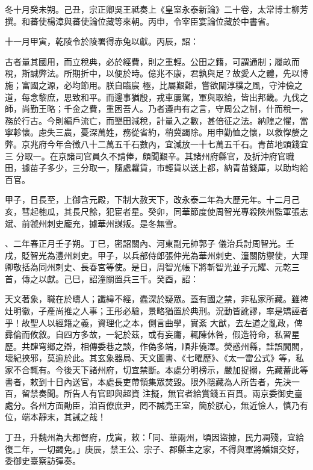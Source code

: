 \begin{pinyinscope}
 冬十月癸未朔。己丑，宗正卿吳王祗奏上《皇室永泰新論》二十卷，太常博士柳芳撰。和蕃使楊漳與蕃使論位藏等來朝。丙申，令宰臣宴論位藏於中書省。



 十一月甲寅，乾陵令於陵署得赤兔以獻。丙辰，詔：



 古者量其國用，而立稅典，必於經費，則之重輕。公田之籍，可謂通制；履畝而稅，斯誠弊法。所期折中，以便於時。億兆不康，君孰與足？故愛人之體，先以博施；富國之源，必均節用。朕自臨宸
 極，比屬艱難，嘗欲闡淳樸之風，守沖儉之道，每念黎庶，思致和平。而邊事猶殷，戎車屢駕，軍與取給，皆出邦畿。九伐之師，尚勤王略；千金之費，重困吾人。乃者遵冉有之言，守周公之制，什而稅一，務於行古。今則編戶流亡，而墾田減稅，計量入之數，甚倍征之法。納隍之懼，當寧軫懷。慮失三農，憂深萬姓，務從省約，稍冀蠲除。用申勤恤之懷，以救惸嫠之弊。京兆府今年合徵八十二萬五千石數內，宜減放一十七萬五千石。青苗地頭錢宜三
 分取一。在京諸司官員久不請俸，頗聞艱辛。其諸州府縣官，及折沖府官職田，據苗子多少，三分取一，隨處糶貨，市輕貨以送上都，納青苗錢厙，以助均給百官。



 甲子，日長至，上御含元殿，下制大赦天下，改永泰二年為大歷元年。十二月己亥，彗起匏瓜，其長尺餘，犯宦者星。癸卯，同華節度使周智光專殺陜州監軍張志斌、前虢州刺史龐充，據華州謀叛。是冬無雪。



 、二年春正月壬子朔。丁巳，密詔關內、河東副元帥郭子
 儀治兵討周智光。壬戌，貶智光為灃州剌史。甲子，以兵部侍郎張仲光為華州刺史、潼關防禦使，大理卿敬括為同州刺史、長春宮等使。是日，周智光帳下將斬智光並子元耀、元乾三首，傳之以獻。己巳，詔潼關置兵三千。癸酉，詔：



 天文著象，職在於疇人；讖緯不經，蠹深於疑眾。蓋有國之禁，非私家所藏。雖裨灶明徽，子產尚推之人事；王彤必驗，景略猶置於典刑。況動皆訛謬，率是矯誣者乎！故聖人以經籍之義，資理化之本，側言曲學，實紊
 大猷，去左道之亂政，俾彞倫而攸敘。自四方多故，一紀於茲，或有妄庸，輒陳休咎，假造符命，私習星歷。共肆穹鄉之辯，相傳委巷之談，作偽多端，順非僥澤。熒惑州縣，詿誤閭閻，壞紀挾邪，莫逾於此。其玄象器局、天文圖書、《七曜歷》、《太一雷公式》等，私家不合輒有。今後天下諸州府，切宜禁斷。本處分明榜示，嚴加捉搦，先藏蓄此等書者，敕到十日內送官，本處長吏帶領集眾焚毀。限外隱藏為人所告者，先決一百，留禁奏聞。所告人有官即與超資
 注擬，無官者給賞錢五百貫。兩京委御史臺處分。各州方面勛臣，洎百僚庶尹，罔不誠亮王室，簡於朕心，無近憸人，慎乃有位，端本靜末，其誡之哉！



 丁丑，升魏州為大都督府，戊寅，敕：「同、華兩州，頃因盜據，民力凋殘，宜給復二年，一切蠲免。」庚辰，禁王公、宗子、郡縣主之家，不得與軍將婚姻交好，委御史臺察訪彈奏。




\end{pinyinscope}
